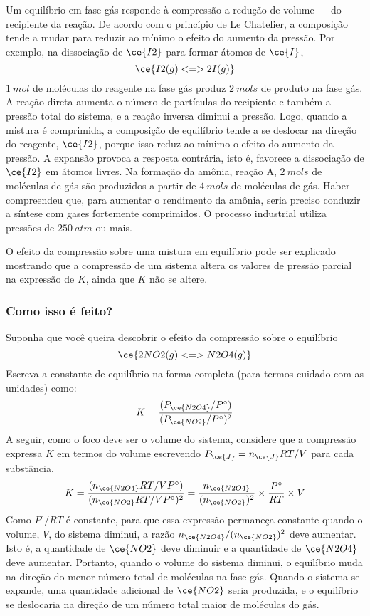 Um equilíbrio em fase gás responde à compressão a redução de volume --- do recipiente da reação. De acordo com o princípio de Le Chatelier, a
composição tende a mudar para reduzir ao mínimo o efeito do aumento da pressão. Por exemplo, na dissociação de \(\ce{I2}\) para formar átomos de
\(\ce{I}\), \[
    \ce{ I2(g) <=> 2 I(g) }
\] \(\qty{1}{\unit{mol}}\) de moléculas do reagente na fase gás produz \(\qty{2}{\unit{mols}}\) de produto na fase gás. A reação direta aumenta o
número de partículas do recipiente e também a pressão total do sistema, e a reação inversa diminui a pressão. Logo, quando a mistura é comprimida, a
composição de equilíbrio tende a se deslocar na direção do reagente, \(\ce{I2}\), porque isso reduz ao mínimo o efeito do aumento da pressão. A
expansão provoca a resposta contrária, isto é, favorece a dissociação de \(\ce{I2}\) em átomos livres. Na formação da amônia, reação A,
\(\qty{2}{\unit{mols}}\) de moléculas de gás são produzidos a partir de \(\qty{4}{\unit{mols}}\) de moléculas de gás. Haber compreendeu que, para
aumentar o rendimento da amônia, seria preciso conduzir a síntese com gases fortemente comprimidos. O processo industrial utiliza pressões de
\(\qty{250}{\unit{atm}}\) ou mais.

O efeito da compressão sobre uma mistura em equilíbrio pode ser explicado mostrando que a compressão de um sistema altera os valores de pressão
parcial na expressão de \(K\), ainda que \(K\) não se altere.

\begin{derivation}

\subsubsection{Como isso é feito?}

Suponha que você queira descobrir o efeito da compressão sobre o equilíbrio \[
    \ce{ 2 NO2(g) <=> N2O4(g) }
\] Escreva a constante de equilíbrio na forma completa (para termos cuidado com as unidades) como: \[
    K = \dfrac{ (P_{\ce{N2O4}}/P^\circ) }{ (P_{\ce{NO2}}/P^\circ)^2 }
\] A seguir, como o foco deve ser o volume do sistema, considere que a compressão expressa \(K\) em termos do volume escrevendo
\(P_{\ce{J}} = n_{\ce{J}} RT/V\) para cada substância. \[
    K = \dfrac{ (n_{\ce{N2O4}}RT/VP^\circ) }{ (n_{\ce{NO2}}RT/VP^\circ)^2 } 
      = \dfrac{ n_{\ce{N2O4}} }{ (n_{\ce{NO2}})^2 } 
        \times 
        \dfrac{ P^\circ }{ RT }
        \times V
\] Como \(P^\circ/RT\) é constante, para que essa expressão permaneça constante quando o volume, \(V\), do sistema diminui, a razão
\(n_{\ce{N2O4}}/(n_{\ce{NO2}})^2\) deve aumentar. Isto é, a quantidade de \(\ce{NO2}\) deve diminuir e a quantidade de \(\ce{N2O4}\) deve aumentar.
Portanto, quando o volume do sistema diminui, o equilíbrio muda na direção do menor número total de moléculas na fase gás. Quando o sistema se
expande, uma quantidade adicional de \(\ce{NO2}\) seria produzida, e o equilíbrio se deslocaria na direção de um número total maior de moléculas do
gás.

\end{derivation}

